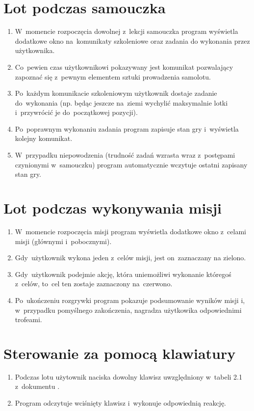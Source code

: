 \documentclass{mwrep}
\begin{document}
\section{Lot podczas samouczka}
\begin{enumerate}
  \item W~momencie rozpoczęcia dowolnej z~lekcji samouczka program wyświetla dodatkowe okno na~komunikaty szkoleniowe oraz zadania do wykonania przez użytkownika.
  \item Co~pewien czas użytkownikowi pokazywany jest komunikat pozwalający zapoznać się z~pewnym elementem sztuki prowadzenia samolotu.
  \item Po~każdym komunikacie szkoleniowym użytkownik dostaje zadanie do~wykonania (np. będąc jeszcze na~ziemi wychylić maksymalnie lotki i~przywrócić je do~początkowej pozycji).
  \item Po~poprawnym wykonaniu zadania program zapisuje stan gry i~wyświetla kolejny komunikat.
  \item W~przypadku niepowodzenia (trudność zadań wzrasta wraz z~postępami czynionymi w~samouczku) program automatycznie wczytuje ostatni zapisany stan gry.
\end{enumerate}

\section{Lot podczas wykonywania misji}
\begin{enumerate}
  \item W~momencie rozpoczęcia misji program wyświetla dodatkowe okno z~celami misji (głównymi i~pobocznymi).
  \item Gdy~użytkownik wykona jeden z~celów misji, jest on~zaznaczany na zielono.
  \item Gdy~użytkownik podejmie akcję, która uniemożliwi wykonanie któregoś z~celów, to~cel ten zostaje zaznaczony na~czerwono.
  \item Po~ukończeniu rozgrywki program pokazuje podsumowanie wyników misji i, w~przypadku pomyślnego zakończenia, nagradza użytkowika odpowiednimi trofeami.
\end{enumerate}

\section{Sterowanie za pomocą klawiatury}
\begin{enumerate}
  \item Podczas lotu użytownik naciska dowolny klawisz uwzględniony w~tabeli 2.1 z~dokumentu \cite{WYM}.
  \item Program odczytuje wciśnięty klawisz i~wykonuje odpowiednią reakcję.
\end{enumerate}
\end{document}
